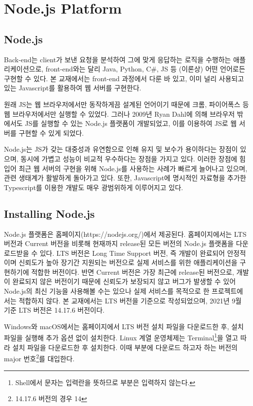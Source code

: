 \section{Node.js Platform}\label{sect:node-js-platform}

\subsection*{Node.js}

Back-end는 client가 보낸 요청을 분석하여 그에 맞게 응답하는 로직을 수행하는 애플리케이션으로, front-end와는 달리 Java, Python, C\#, JS 등 (이론상) 어떤 언어로든 구현할 수 있다. 본 교재에서는 front-end 과정에서 다룬 바 있고, 이미 널리 사용되고 있는 Javascript를 활용하여 웹 서버를 구현한다.

원래 JS는 웹 브라우저에서만 동작하게끔 설계된 언어이기 때문에 크롬, 파이어폭스 등 웹 브라우저에서만 실행할 수 있었다. 그러나 2009년 Ryan Dahl에 의해 브라우저 밖에서도 JS를 실행할 수 있는 Node.js 플랫폼이 개발되었고, 이를 이용하여 JS로 웹 서버를 구현할 수 있게 되었다.

Node.js는 JS가 갖는 대중성과 유연함으로 인해 유지 및 보수가 용이하다는 장점이 있으며, 동시에 가볍고 성능이 비교적 우수하다는 장점을 가지고 있다. 이러한 장점에 힘입어 최근 웹 서버의 구현을 위해 Node.js를 사용하는 사례가 빠르게 늘어나고 있으며, 관련 생태계가 활발하게 돌아가고 있다. 또한, Javascript에 명시적인 자료형을 추가한 Typescript를 이용한 개발도 매우 광범위하게 이루어지고 있다.

\subsection*{Installing Node.js}

Node.js 플랫폼은 홈페이지(https://nodejs.org/)에서 제공된다. 홈페이지에서는 LTS 버전과 Current 버전을 비롯해 현재까지 release된 모든 버전의 Node.js 플랫폼을 다운로드받을 수 있다. LTS 버전은 Long Time Support 버전, 즉 개발이 완료되어 안정적이며 신뢰도가 높아 장기간 지원되는 버전으로 실제 서비스를 위한 애플리케이션을 구현하기에 적합한 버전이다. 반면 Current 버전은 가장 최근에 release된 버전으로, 개발이 완료되지 않은 버전이기 때문에 신뢰도가 보장되지 않고 버그가 발생할 수 있어 Node.js의 최신 기능을 사용해볼 수는 있으나 실제 서비스를 목적으로 한 프로젝트에서는 적합하지 않다. 본 교재에서는 LTS 버전을 기준으로 작성되었으며, 2021년 9월 기준 LTS 버전은 14.17.6 버전이다.

Windows와 macOS에서는 홈페이지에서 LTS 버전 설치 파일을 다운로드한 후, 설치 파일을 실행해 추가 옵션 없이 설치한다. Linux 계열 운영체제는 Terminal\footnote{Shell에서 \cd{\$} 문자는 입력란을 뜻하므로 \cd{\$ } 부분은 입력하지 않는다.}을 열고 \을 따라 설치 파일을 다운로드한 후 설치한다. 이때  부분에 다운로드 하고자 하는 버전의 major 번호\footnote{14.17.6 버전의 경우 14}를 대입한다.


